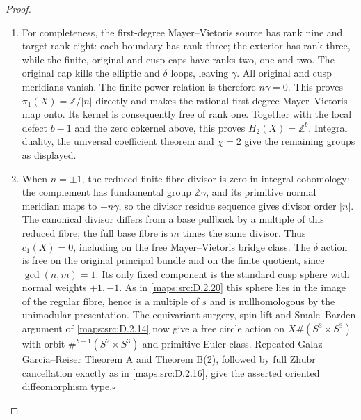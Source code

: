 \begin{proof}
\begin{enumerate}[label=\arabic*.,leftmargin=*]
\item For completeness, the first-degree Mayer--Vietoris source has rank nine
and target rank eight: each boundary has rank three; the exterior has
rank three, while the finite, original and cusp caps have ranks two,
one and two. The original cap kills the elliptic and $\delta$ loops,
leaving $\gamma$. All original and cusp meridians vanish. The finite
power relation is therefore $n\gamma=0$. This proves
$\pi_1(X)=\mathbb Z/|n|$ directly and makes the rational first-degree
Mayer--Vietoris map onto. Its kernel is consequently free of rank one.
Together with the local defect $b-1$ and the zero cokernel above, this
proves $H_2(X)=\mathbb Z^b$. Integral duality, the universal coefficient
theorem and $\chi=2$ give the remaining groups as displayed.

\item When $n=\pm1$, the reduced finite fibre divisor is zero in integral
cohomology: the complement has fundamental group $\mathbb Z\gamma$,
and its primitive normal meridian maps to $\pm n\gamma$, so the divisor
residue sequence gives divisor order $|n|$. The canonical divisor differs
from a base pullback by a multiple of this reduced fibre; the full base
fibre is $m$ times the same divisor. Thus $c_1(X)=0$, including on the free
Mayer--Vietoris bridge class. The $\delta$ action is free on the original
principal bundle and on the finite quotient, since $\gcd(n,m)=1$.
Its only fixed component is the standard cusp sphere with normal weights
$+1,-1$. As in \ref{maps:src:D.2.20} this sphere lies in the image of the regular fibre,
hence is a multiple of $s$ and is nullhomologous by the unimodular
presentation. The equivariant surgery, spin lift and Smale--Barden
argument of \ref{maps:src:D.2.14} now give a free circle action on
$X\#(S^3\times S^3)$ with orbit
$\#^{b+1}(S^2\times S^3)$ and primitive Euler class.
Repeated Galaz-Garc\'ia--Reiser Theorem A and Theorem B(2), followed by
full Zhubr cancellation exactly as in \ref{maps:src:D.2.16}, give the asserted oriented
diffeomorphism type.\hfill$\square$
\end{enumerate}
\end{proof}


